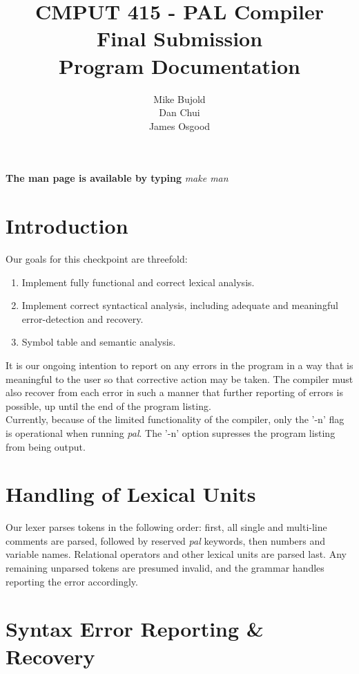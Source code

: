 \documentclass{report}
\title{CMPUT 415 - PAL Compiler\\Final Submission\\Program Documentation}
\author{Mike Bujold \\
Dan Chui \\ 
James Osgood }
\begin{document}
\maketitle
\textbf{The man page is available by typing} \emph{make man}

\section*{Introduction}
Our goals for this checkpoint are threefold:
\begin{enumerate}
\item Implement fully functional and correct lexical analysis.
\item Implement correct syntactical analysis, including adequate and meaningful error-detection and recovery.
\item Symbol table and semantic analysis.
\end{enumerate}

It is our ongoing intention to report on any errors in the program in a way that is meaningful to the user so that corrective action may be taken. The compiler must also recover from each error in such a manner that further reporting of errors is possible, up until the end of the program listing.\\
Currently, because of the limited functionality of the compiler, only the '-n' flag is operational when running \emph{pal}. The '-n' option supresses the program listing from being output.


\section*{Handling of Lexical Units}
Our lexer parses tokens in the following order: first, all single and multi-line comments are parsed, followed by reserved \emph{pal} keywords, then numbers and variable names. Relational operators and other lexical units are parsed last. Any remaining unparsed tokens are presumed invalid, and the grammar handles reporting the error accordingly.


\section*{Syntax Error Reporting \& Recovery}
\end{document}
